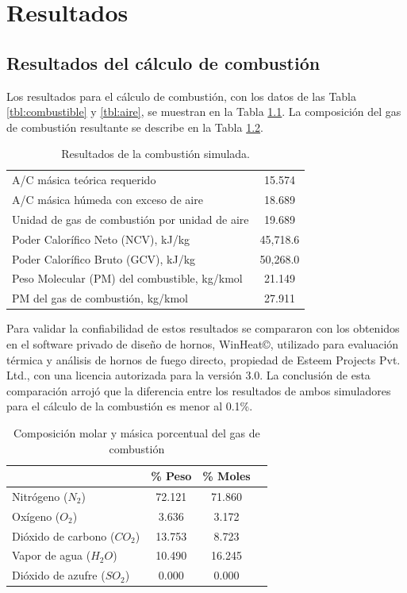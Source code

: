 \chapter{Resultados}

\section{Resultados del cálculo de combustión}
\par Los resultados para el cálculo de combustión, con los datos de las Tabla \ref{tbl:combustible} y \ref{tbl:aire}, se muestran en la Tabla \ref{tbl:combustion-data}. La composición del gas de combustión resultante se describe en la Tabla \ref{tbl:combustion-gas}.
\begin{table}[hbt]
\begin{center}
\caption[Resultados de la combustión simulada]{Resultados de la combustión simulada.}
\label{tbl:combustion-data}
\begin{tabular}{l|c}
	A/C másica teórica requerido					& 15.574 \\
	A/C másica húmeda con exceso de aire			& 18.689 \\
	Unidad de gas de combustión por unidad de aire  & 19.689 \\
	Poder Calorífico Neto  (NCV), kJ/kg				& 45,718.6 \\
	Poder Calorífico Bruto (GCV), kJ/kg				& 50,268.0 \\
	Peso Molecular (PM) del combustible, kg/kmol	& 21.149 \\
	PM del gas de combustión, kg/kmol				& 27.911 \\
\end{tabular}
\end{center}
\end{table}
\par Para validar la confiabilidad de estos resultados se compararon con los obtenidos en el software privado de diseño de hornos, WinHeat\copyright, utilizado para evaluación térmica y análisis de hornos de fuego directo, propiedad de Esteem Projects Pvt. Ltd., con una licencia autorizada para la versión 3.0. La conclusión de esta comparación arrojó que la diferencia entre los resultados de ambos simuladores para el cálculo de la combustión es menor al 0.1\%. 
\begin{table}[htb]
\begin{center}
\caption[Composición del gas de combustión]{Composición molar y másica porcentual del gas de combustión}
\label{tbl:combustion-gas}
\begin{tabular}{l|c|c|c}
		& \% Peso & \% Moles \\
	\hline
	Nitrógeno ($N_2$)			& 72.121	& 71.860 \\
	Oxígeno ($O_2$)				& 3.636 	& 3.172	 \\
	Dióxido de carbono ($CO_2$)	& 13.753	& 8.723	 \\
	Vapor de agua ($H_2O$)		& 10.490	& 16.245 \\
	Dióxido de azufre ($SO_2$)	& 0.000 	& 0.000	 \\
\end{tabular}
\end{center}
\end{table}

